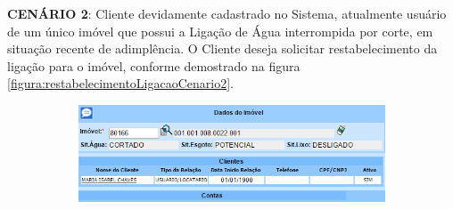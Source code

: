 \begin{flushleft}
	\begin{description}
		\item \textbf{CENÁRIO 2}: Cliente devidamente cadastrado no Sistema, atualmente usuário de um único imóvel que possui a Ligação de Água interrompida por corte, em situação recente de adimplência. O Cliente deseja solicitar restabelecimento da ligação para o imóvel, conforme demostrado na figura \ref{figura:restabelecimentoLigacaoCenario2}.
		\begin{figure}[H]
			\centering
			\caption{Restabelecimento da Ligação de Água - Cenário de Teste 2}
			\label{figura:restabelecimentoLigacaoCenario2}
			\begin{subfigure}[H]{\textwidth}
				\centering
				\includegraphics{figuras/cenarios/restabelecimento/cenario_2.PNG}
			\end{subfigure}
		\end{figure}
	\end{description}
	

\end{flushleft}
